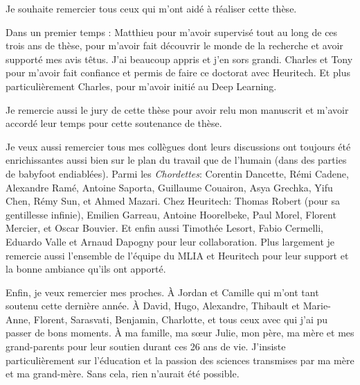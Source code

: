 
Je souhaite remercier tous ceux qui m'ont aidé à réaliser cette thèse.

Dans un premier temps : Matthieu pour m'avoir supervisé tout au long de ces trois ans de thèse,
pour m'avoir fait découvrir le monde de la recherche et avoir supporté mes avis têtus. J'ai beaucoup
appris et j'en sors grandi. Charles et Tony pour m'avoir fait confiance et permis de faire ce
doctorat avec Heuritech. Et plus particulièrement Charles, pour m'avoir initié au Deep Learning.

Je remercie aussi le jury de cette thèse pour avoir relu mon manuscrit et m'avoir accordé leur temps
pour cette soutenance de thèse.

Je veux aussi remercier tous mes collègues dont leurs discussions ont toujours été enrichissantes
aussi bien sur le plan du travail que de l'humain (dans des parties de babyfoot endiablées). Parmi
les \textit{Chordettes}: Corentin Dancette, Rémi Cadene, Alexandre Ramé, Antoine Saporta, Guillaume
Couairon, Asya Grechka, Yifu Chen, Rémy Sun, et Ahmed Mazari. Chez Heuritech: Thomas Robert (pour sa
gentillesse infinie), Emilien Garreau, Antoine Hoorelbeke, Paul Morel, Florent Mercier, et Oscar
Bouvier. Et enfin aussi Timothée Lesort, Fabio Cermelli, Eduardo Valle et Arnaud Dapogny pour leur
collaboration. Plus largement je remercie aussi l'ensemble de l'équipe du MLIA et Heuritech pour
leur support et la bonne ambiance qu'ils ont apporté.

Enfin, je veux remercier mes proches. À Jordan et Camille qui m'ont tant soutenu cette dernière
année. À David, Hugo, Alexandre, Thibault et Marie-Anne, Florent, Sarasvati, Benjamin, Charlotte,
et tous ceux avec qui j'ai pu passer de bons moments. À ma famille, ma sœur Julie, mon père, ma
mère et mes grand-parents pour leur soutien durant ces 26 ans de vie. J'insiste particulièrement
sur l'éducation et la passion des sciences transmises par ma mère et ma grand-mère. Sans cela, rien
n'aurait été possible.


